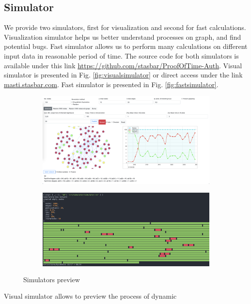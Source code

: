 \documentclass[nostrict]{szablonPG}
\begin{document}
\subsection{Simulator}
We provide two simulators, first for visualization and second for fast calculations. Visualization simulator helps us better understand processes on graph, and find potential bugs. Fast simulator allows us to perform many calculations on different input data in reasonable period of time. The source code for both simulators is available under this link \url{https://github.com/stasbar/ProofOfTime-Auth}. Visual simulator is presented in Fig. \ref{fig:visualsimulator} or direct access under the link \url{masti.stasbar.com}. Fast simulator is presented in Fig. \ref{fig:fastsimulator}.
\begin{figure}
\begin{subfigure}{.5\textwidth}
    \centering
    \includegraphics[width=5cm=.8\linewidth]{img/simulator.png}
\end{subfigure}%
\begin{subfigure}{.5\textwidth}
    \centering
    \includegraphics[width=5cm.8\linewidth]{img/fastsimulator.png}
\end{subfigure}
\caption{Simulators preview}
\label{fig:simulators}
\end{figure}

Visual simulator allows to preview the process of dynamic 
\end{document}
